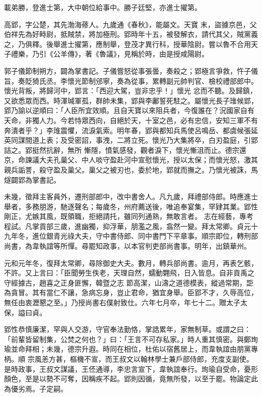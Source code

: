 \begin{pinyinscope}
 載弟勝，登進士第，大中朝位給事中。勝子廷堅，亦進士擢第。



 高郢，字公楚，其先渤海蓚人。九歲通《春秋》，能屬文。天寶
 末，盜據京邑，父伯祥先為好畤尉，抵賊禁，將加極刑。郢時年十五，被發解衣，請代其父，賊黨義之，乃俱釋。後舉進士擢第，應制舉，登茂才異行科，授華陰尉。嘗以魯不合用天子禮樂，乃引《公羊傳》，著《魯議》，見稱於時，由是授咸陽尉。



 郭子儀節制朔方，闢為掌書記。子儀嘗怒從事張曇，奏殺之；郢極言爭救，忤子儀旨，奏貶猗氏丞。李懷光節制邠寧，奏為從事，累轉副元帥判官、檢校禮部郎中。懷光背叛，將歸河中，郢言：「西迎大駕，豈非忠乎！」懷光
 忿而不聽。及歸鎮，又欲悉眾而西。時渾瑊軍孤，群帥未集，郢與李鄘誓死駐之。屬懷光長子琟候郢，郢乃諭以逆順曰：「人臣所宜效順。且自天寶以來阻兵者，今復誰在？況國家自有天命，非獨人力。今若恃眾西向，自絕於天，十室之邑，必有忠信，安知三軍不有奔潰者乎？」李琟震懼，流淚氣索。明年春，郢與都知兵馬使呂鳴岳、都虞候張延英同謀間道上表；及受密詔，事洩，二將立死。懷光乃大集將卒，白刃盈庭，引郢詰之。郢挺然抗辭，無所
 慚隱，憤氣感發，觀者淚下，懷光慚沮而止。德宗還京，命諫議大夫孔巢父、中人啖守盈赴河中宣慰懷光，授以太保；而懷光怒，激其親兵詬詈，殺守盈及巢父。巢父之被刃也，委於地，郢就而撫之。乃懷光被誅，馬燧闢郢為掌書記。



 未幾，徵拜主客員外，遷刑部郎中，改中書舍人。凡九歲，拜禮部侍郎。時應進士舉者，多務朋游，馳逐聲名；每歲冬，州府薦送後，唯追奉宴集，罕肄其業。郢性剛正，尤嫉其風，既領職，拒絕請托，雖同列通熟，無敢言者。
 志在經藝，專考程試。凡掌貢部三歲，進幽獨，抑浮華，朋濫之風，翕然一變。拜太常卿。貞元十九年冬，進位銀青光祿大夫，守中書侍郎、同中書門下平章事。順宗即位，轉刑部尚書，為韋執誼等所憚。尋罷知政事，以本官判吏部尚書事。明年，出鎮華州。



 元和元年冬，復拜太常卿，尋除御史大夫。數月，轉兵部尚書。逾月，再表乞骸，不許。又上言曰：「臣聞勞生佚老，天理自然，蠕動翾飛，日入皆息。自非貢禹之守經據古，趙喜之正身匪懈，韓暨之志
 節高潔，山濤之道德模表，縱過常期，詎為貪冒。其有當仁不讓，急病忘身，豈止君命，猶宜身舉。臣郢不才，久辱高位，無任由衷瀝懇之至。」乃授尚書右僕射致仕。六年七月卒，年七十二。贈太子太保，謚曰貞。



 郢性恭慎廉潔，罕與人交游，守官奉法勤恪，掌誥累年，家無制草。或謂之曰：「前輩皆留制集，公焚之何也？」曰：「王言不可存私家。」時人重其慎密。與鄭珣瑜並命拜相；未幾，德宗升遐。時同在相位，杜佑以宿舊居上，而韋執誼由朋黨專柄。順
 宗風恙方甚，樞機不宣，而王叔文以翰林學士兼戶部侍郎，充度支副使。是時政事，王叔文謀議，王伾通導，李忠言宣下，韋執誼奉行。珣瑜自受命，憂形顏色，至是以勢不可奪，因稱疾不起。郢則因循，竟無所發，以至于罷。物論定此為優劣焉。子定嗣。




\end{pinyinscope}
